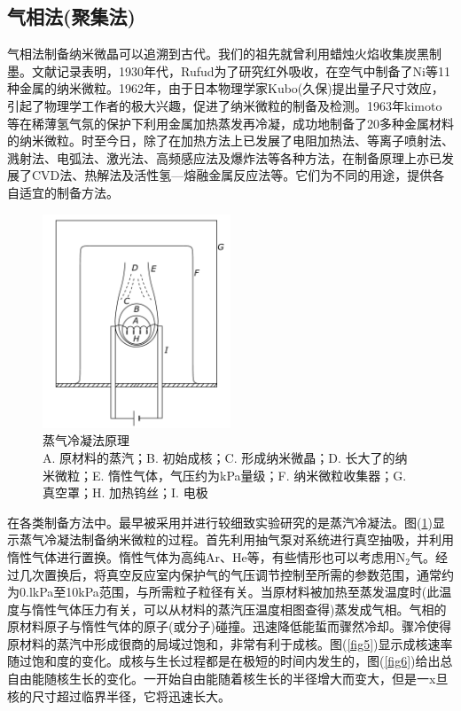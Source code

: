\documentclass[a4paper]{article}
\begin{document}
\subsection{气相法(聚集法)}
气相法制备纳米微晶可以追溯到古代。我们的祖先就曾利用蜡烛火焰收集炭黑制墨。文献记录表明，1930年代，Rufud为了研究红外吸收，在空气中制备了Ni等11种金属的纳米微粒。1962年，由于日本物理学家Kubo(久保)提出量子尺寸效应，引起了物理学工作者的极大兴趣，促进了纳米微粒的制备及检测。1963年kimoto等在稀薄氢气氛的保护下利用金属加热蒸发再冷凝，成功地制备了20多种金属材料的纳米微粒。时至今日，除了在加热方法上已发展了电阻加热法、等离子喷射法、溅射法、电弧法、激光法、高频感应法及爆炸法等各种方法，在制备原理上亦已发展了CVD法、热解法及活性氢—熔融金属反应法等。它们为不同的用途，提供各自适宜的制备方法。
\begin{figure}
\centering
\includegraphics[width=0.5\textwidth]{fig/fig4.pdf}
\caption{蒸气冷凝法原理\\A. 原材料的蒸汽；B. 初始成核；C. 形成纳米微晶；D. 长大了的纳米微粒；E. 惰性气体，气压约为kPa量级；F. 纳米微粒收集器；G. 真空罩；H. 加热钨丝；I. 电极}\label{fig4}
\end{figure}

在各类制备方法中。最早被采用并进行较细致实验研究的是蒸汽冷凝法。图(\ref{fig4})显示蒸气冷凝法制备纳米微粒的过程。首先利用抽气泵对系统进行真空抽吸，并利用惰性气体进行置换。惰性气体为高纯Ar、He等，有些情形也可以考虑用N$_2$气。经过几次置换后，将真空反应室内保护气的气压调节控制至所需的参数范围，通常约为0.lkPa至10kPa范围，与所需粒子粒径有关。当原材料被加热至蒸发温度时(此温度与惰性气体压力有关，可以从材料的蒸汽压温度相图查得)蒸发成气相。气相的原材料原子与惰性气体的原子(或分子)碰撞。迅速降低能蜇而骤然冷却。骤冷使得原材料的蒸汽中形成很商的局域过饱和，非常有利于成核。图(\ref{fig5})显示成核速率随过饱和度的变化。成核与生长过程都是在极短的时间内发生的，图(\ref{fig6})给出总自由能随核生长的变化。一开始自由能随着核生长的半径增大而变大，但是一x旦核的尺寸超过临界半径，它将迅速长大。
\end{document}

